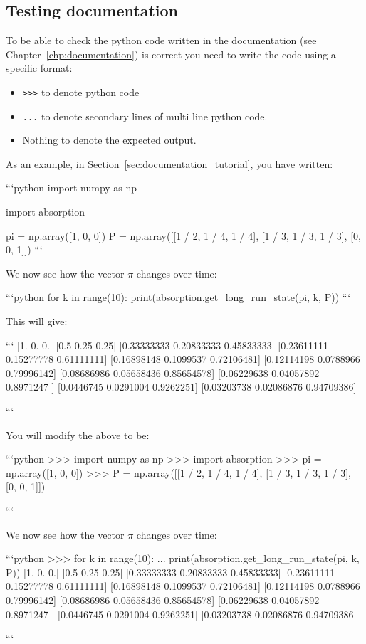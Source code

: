 \subsection{Testing documentation}
\label{\detokenize{building-tools/07-testing/tutorial/main:testing-documentation}}

To be able to check the python code written in the documentation (see
Chapter~\ref{chp:documentation}) is
correct you need to write the code using a specific format:

\begin{itemize}
\item 

\texttt{>>>} to denote python code

\item 

\texttt{...} to denote secondary lines of multi line python code.

\item 

Nothing to denote the expected output.

\end{itemize}


As an example, in Section~\ref{sec:documentation_tutorial}, you have written:

\begin{md}
```python
import numpy as np

import absorption

pi = np.array([1, 0, 0])
P = np.array([[1 / 2, 1 / 4, 1 / 4], [1 / 3, 1 / 3, 1 / 3], [0, 0, 1]])
```

We now see how the vector $\pi$ changes over time:

```python
for k in range(10):
    print(absorption.get_long_run_state(pi, k, P))
```

This will give:

```
[1. 0. 0.]
[0.5  0.25 0.25]
[0.33333333 0.20833333 0.45833333]
[0.23611111 0.15277778 0.61111111]
[0.16898148 0.1099537  0.72106481]
[0.12114198 0.0788966  0.79996142]
[0.08686986 0.05658436 0.85654578]
[0.06229638 0.04057892 0.8971247 ]
[0.0446745 0.0291004 0.9262251]
[0.03203738 0.02086876 0.94709386]

```
\end{md}


You will modify the above to be:

\begin{md}
```python
>>> import numpy as np
>>> import absorption
>>> pi = np.array([1, 0, 0])
>>> P = np.array([[1 / 2, 1 / 4, 1 / 4], [1 / 3, 1 / 3, 1 / 3], [0, 0, 1]])

```

We now see how the vector $\pi$ changes over time:

```python
>>> for k in range(10):
...     print(absorption.get_long_run_state(pi, k, P))
[1. 0. 0.]
[0.5  0.25 0.25]
[0.33333333 0.20833333 0.45833333]
[0.23611111 0.15277778 0.61111111]
[0.16898148 0.1099537  0.72106481]
[0.12114198 0.0788966  0.79996142]
[0.08686986 0.05658436 0.85654578]
[0.06229638 0.04057892 0.8971247 ]
[0.0446745 0.0291004 0.9262251]
[0.03203738 0.02086876 0.94709386]

```
\end{md}



